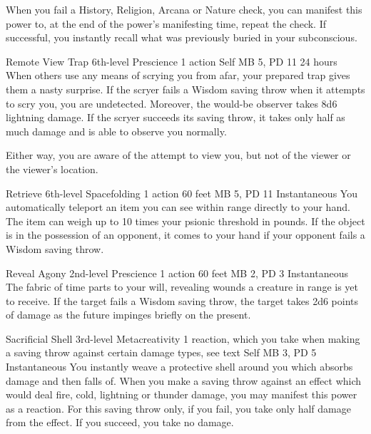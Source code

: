 When you fail a History, Religion, Arcana or Nature check,
you can manifest this power to, at the end of the
power's manifesting time, repeat the check.
If successful, you instantly recall
what was previously buried in your subconscious.

\DndPowerHeader%
  {Remote View Trap}
  {6th-level Prescience}
  {1 action}
  {Self}
  {MB 5, PD 11}
  {24 hours}
  When others use any means of scrying you from afar,
  your prepared trap gives them a nasty surprise.
  If the scryer fails a Wisdom saving throw
  when it attempts to scry you,
  you are undetected.
  Moreover, the would-be observer takes 8d6 lightning damage.
  If the scryer succeeds its saving throw,
  it takes only half as much damage
  and is able to observe you normally.
  
  Either way, you are aware of the attempt to view you,
  but not of the viewer or the viewer's location.

\DndPowerHeader%
  {Retrieve}
  {6th-level Spacefolding}
  {1 action}
  {60 feet}
  {MB 5, PD 11}
  {Instantaneous}
  You automatically teleport an item you can see within range
  directly to your hand.
  The item can weigh up to
  10 times your psionic threshold in pounds.
  If the object is in the possession of an opponent,
  it comes to your hand if your opponent
  fails a Wisdom saving throw.

\DndPowerHeader%
  {Reveal Agony}
  {2nd-level Prescience}
  {1 action}
  {60 feet}
  {MB 2, PD 3}
  {Instantaneous}
  The fabric of time parts to your will,
  revealing wounds a creature in range is yet to receive.
  If the target fails a Wisdom saving throw,
  the target takes 2d6 points of damage as the future
  impinges briefly on the present.

\DndPowerHeader%
  {Sacrificial Shell}
  {3rd-level Metacreativity}
  {1 reaction, which you take when making a saving throw
    against certain damage types, see text}
  {Self}
  {MB 3, PD 5}
  {Instantaneous}
You instantly weave a protective shell around you
which absorbs damage and then falls of.
When you make a saving throw against an effect
which would deal fire, cold, lightning or thunder damage,
you may manifest this power as a reaction.
For this saving throw only,
if you fail, you take only half damage from the effect.
If you succeed, you take no damage.

